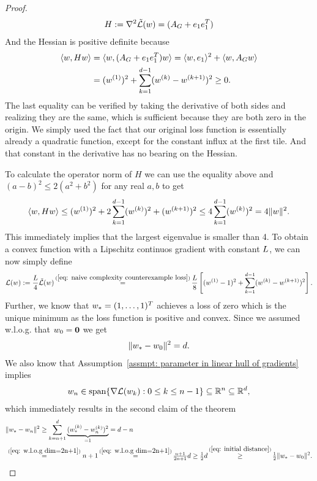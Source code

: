\begin{proof}
\begin{align*}
		H := \nabla^2\tilde{\mathcal{L}}(w) = (A_G + e_1 e_1^T)
	\end{align*}
	And the Hessian is positive definite because
	\begin{align*}
		\langle w , H w\rangle
		&= \langle w, (A_G + e_1 e_1^T) w \rangle
		= \langle w, e_1\rangle^2
		+ \langle w, A_G w\rangle
		\\
		&= (w^{(1)})^2
		+ \sum_{k=1}^{d-1}(w^{(k)}-w^{(k+1)})^2
		\ge 0.
	\end{align*}
	The last equality can be verified by taking the derivative of both sides and
	realizing they are the same, which is sufficient because they are both zero	
	in the origin. We simply used the fact that our original loss function
	is essentially already a quadratic function, except for the constant influx
	at the first tile. And that constant in the derivative has no bearing on the
	Hessian.


	To calculate the operator norm of \(H\) we can use the equality above and	
	\((a-b)^2 \le 2(a^2 + b^2)\) for any real \(a,b\) to get
	\begin{align*}
		\langle w, Hw\rangle
		\le (w^{(1)})^2 + 2\sum_{k=1}^{d-1}(w^{(k)})^2 + (w^{(k+1)})^2 
		\le 4 \sum_{k=1}^{d-1} (w^{(k)})^2
		= 4 \|w\|^2.
	\end{align*}
	This immediately implies that the largest eigenvalue is smaller than 4. To
	obtain a convex function with a Lipschitz continuos gradient with constant
	\(L\), we can now simply define
	\begin{align*}
		\Loss(\weights):= \frac{\ubound}{4}\tilde{\Loss}(\weights)
		\xeq{(\ref{eq: naive complexity counterexample loss})} \frac\ubound{8}\left[
			(\weights^{(1)}-1)^2
			+ \sum_{k=1}^{\dimension-1} (\weights^{(k)}-\weights^{(k+1)})^2
		\right].
	\end{align*}
	Further, we know that \(w_* = (1,\dots,1)^T\) achieves a loss of zero which is
	the unique minimum as the loss function is positive and convex. Since we
	assumed w.l.o.g. that \(w_0=\mathbf{0}\) we get
	\begin{align}\label{eq: initial distance}
		\|w_* - w_0\|^2 = d.
	\end{align}
	We also know
	that Assumption~\ref{assmpt: parameter in linear hull of gradients} implies
	\begin{align*}
		w_n \in \text{span}\{\nabla\mathcal{L}(w_k): 0 \le k \le n-1\}
		\subseteq \mathbb{R}^n \subseteq \mathbb{R}^d,
	\end{align*}
	which immediately results in the second claim of the theorem
	\begin{align*}
		\|\minimum - \weights_n\|^2
		&\ge \sum_{k=n+1}^d \underbrace{(\minimum^{(k)}- \weights_n^{(k)})^2}_{=1}
		= d-n \\
		&\lxeq{(\ref{eq: w.l.o.g dim=2n+1})} n+1
		\xeq{(\ref{eq: w.l.o.g dim=2n+1})} \tfrac{n+1}{2n+1} d
		\ge \tfrac12 d
		\xge{(\ref{eq: initial distance})} \tfrac12 \|\minimum - \weights_0\|^2. 
	\end{align*}


\end{proof}
